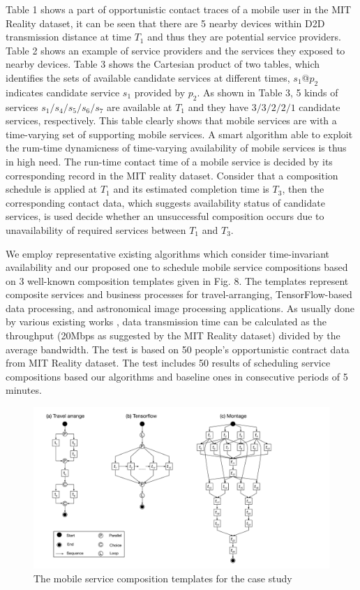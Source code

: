\documentclass[journal]{IEEEtran}
\begin{document}
Table 1 shows a part of opportunistic contact traces of a mobile user in the MIT Reality dataset, it can be seen that there are 5 nearby devices within D2D transmission distance at time $T_1$ and thus they are potential service providers. Table 2 shows an example of service providers and the services they exposed to nearby devices. Table 3 shows the Cartesian product of two tables, which identifies the sets of available candidate services at different times, $s_1$@$p_2$ indicates candidate service $s_1$ provided by $p_2$.
As shown in Table 3, 5 kinds of services $s_1/s_4/s_5/s_6/s_7$ are available at $T_1$ and they have $3/3/2/2/1$ candidate services, respectively.
This table clearly shows that mobile services are with a time-varying set of supporting mobile services.
A smart algorithm able to exploit the rum-time dynamicness of time-varying availability of mobile services is thus in high need. The run-time contact time of a mobile service is decided by its corresponding record in the MIT reality dataset. Consider that a composition schedule is applied at $T_1$ and its estimated completion time is $T_3$, then the corresponding contact data, which suggests availability status of candidate services, is used decide whether an unsuccessful composition occurs due to unavailability of required services between $T_1$ and $T_3$.

We employ representative existing algorithms \cite{Deng2017} \cite{sadiq2015service} which consider time-invariant availability and our proposed one to schedule mobile service compositions based on 3 well-known composition templates given in Fig. 8. 
The templates represent composite services and business processes for travel-arranging, TensorFlow-based data processing, and astronomical image processing applications. As usually done by various existing works \cite{Meena2016Cost, Rodriguez2014Deadline}, data transmission time can be calculated as the throughput (20Mbps as suggested by the MIT Reality dataset) divided by the average bandwidth. 
The test is based on 50 people’s opportunistic contract data from MIT Reality dataset. The test includes 50 results of scheduling service compositions based our algorithms and baseline ones in consecutive periods of 5 minutes. 



\begin{figure}[!t]
\centering
\includegraphics[width=5in]{./img/DAG.pdf}
\caption{The mobile service composition templates for the case study}
\label{DAG}
\end{figure}
\end{document}
